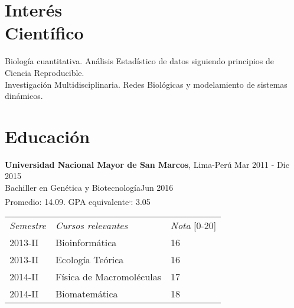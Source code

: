 \documentclass[margin,line]{res}
\begin{document}
	
	\address{Calle Tambo Huascar 201, San Miguel, Lima-Perú}
	\address{\textit{contacto:} avallecam@gmail.com o (+51)950951722}
	
	\begin{resume}
		
		\vspace*{.15in}
		
		\section{\sc Interés \\Científico}
		
		
		Biología cuantitativa. Análisis Estadístico de datos siguiendo principios de Ciencia Reproducible.\\
		Investigación Multidisciplinaria. Redes Biológicas y modelamiento de sistemas dinámicos.\\%
		
		\section{\sc Educación}
		{\bf Universidad Nacional Mayor de San Marcos}, Lima-Perú \hfill Mar 2011 - Dic 2015\\
		Bachiller en Genética y Biotecnología\hfill Jun 2016\\
		Promedio: 14.09. GPA equivalente\footnotemark\textsuperscript{,}\footnotemark: 3.05\\%
		
		\begin{center}
			\vspace{-9mm}
			\begin{tabular}{lll}
				\textit{Semestre} & \textit{Cursos relevantes} & \textit{Nota} [0-20] \\
				2013-II & Bioinformática & 16\\
				2013-II & Ecología Teórica & 16\\
				2014-II & Física de Macromoléculas & 17\\
				2014-II & Biomatemática & 18\\
			\end{tabular}
			\vspace{4mm}
		\end{center}
		

\end{resume}
\end{document}
